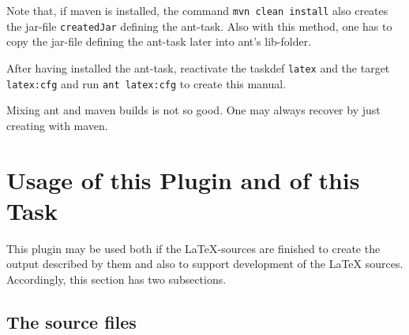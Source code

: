 \documentclass[12pt]{article}
\begin{document}
Note that, if maven is installed, the command {\tt mvn clean install} 
also creates the jar-file {\tt createdJar} defining the ant-task. 
Also with this method, one has to copy the jar-file defining the ant-task 
later into ant's lib-folder. 

After having installed the ant-task, 
reactivate the taskdef {\tt latex} and the target {\tt latex:cfg} 
and run {\tt ant latex:cfg} to create this manual. 

Mixing ant and maven builds is not so good. 
One may always recover by just creating with maven. 



\section{Usage of this Plugin and of this Task}\label{sec:usage}

This plugin may be used both if the \LaTeX-sources are finished 
to create the output described by them 
and also to support development of the \LaTeX{} sources. 
Accordingly, this section has two subsections. 

\subsection{The source files}\label{subsec:sources}
\end{document}
